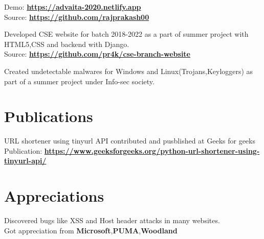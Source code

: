 \documentclass[]{deedy-resume-openfont}
\begin{document}
\begin{minipage}[t]{0.66\textwidth}
Demo: \textbf{\href{https://advaita-2020.netlify.app}{https://advaita-2020.netlify.app}}\\
Source: \textbf{\href{https://github.com/rajprakash00}{https://github.com/rajprakash00}}

\sectionsep

Developed CSE website for batch 2018-2022 as a part of summer project with HTML5,CSS and backend with Django. \\
Source: \textbf{\href{https://github.com/pr4k/cse-branch-website}{https://github.com/pr4k/cse-branch-website}}
\sectionsep

Created undetectable malwares for Windows and
Linux(Trojans,Keyloggers) as part of a summer project under Info-sec society.
\sectionsep


\section{Publications} 
URL shortener using tinyurl API contributed and pusblished at Geeks for geeks\\
Publication: \textbf{\href{https://www.geeksforgeeks.org/python-url-shortener-using-tinyurl-api/}{https://www.geeksforgeeks.org/python-url-shortener-using-tinyurl-api/}}


\section{Appreciations}
Discovered bugs like XSS and Host header attacks in many websites.\\
Got appreciation from \textbf{Microsoft},\textbf{PUMA},\textbf{Woodland}

\end{minipage} 
\end{document}
